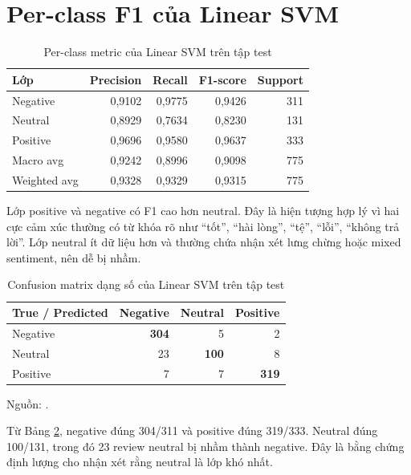 \section{Per-class F1 của Linear SVM}
\begin{table}[H]\centering\caption{Per-class metric của Linear SVM trên tập test}\label{tab:linear-svm-per-class}\begin{tabular}{lrrrr}\toprule Lớp & Precision & Recall & F1-score & Support \\\midrule Negative & 0,9102 & 0,9775 & 0,9426 & 311 \\ Neutral & 0,8929 & 0,7634 & 0,8230 & 131 \\ Positive & 0,9696 & 0,9580 & 0,9637 & 333 \\ Macro avg & 0,9242 & 0,8996 & 0,9098 & 775 \\ Weighted avg & 0,9328 & 0,9329 & 0,9315 & 775 \\\bottomrule\end{tabular}\end{table}

Lớp positive và negative có F1 cao hơn neutral. Đây là hiện tượng hợp lý vì hai cực cảm xúc thường có từ khóa rõ như “tốt”, “hài lòng”, “tệ”, “lỗi”, “không trả lời”. Lớp neutral ít dữ liệu hơn và thường chứa nhận xét lưng chừng hoặc mixed sentiment, nên dễ bị nhầm.


\begin{table}[H]
\centering
\caption[Confusion matrix dạng số của Linear SVM]{Confusion matrix dạng số của Linear SVM trên tập test}
\label{tab:linear-svm-confusion-counts}
\begin{tabular}{lrrr}
\toprule
True / Predicted & Negative & Neutral & Positive \\
\midrule
Negative & \textbf{304} & 5 & 2 \\
Neutral & 23 & \textbf{100} & 8 \\
Positive & 7 & 7 & \textbf{319} \\
\bottomrule
\end{tabular}
{\footnotesize Nguồn: .}
\end{table}
Từ Bảng \ref{tab:linear-svm-confusion-counts}, negative đúng 304/311 và positive đúng 319/333. Neutral đúng 100/131, trong đó 23 review neutral bị nhầm thành negative. Đây là bằng chứng định lượng cho nhận xét rằng neutral là lớp khó nhất.


